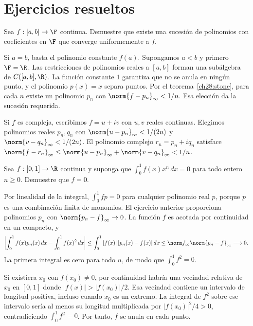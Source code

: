 \section{Ejercicios resueltos}
\begin{ejercicio}
Sea $f:[a,b]\to\F$ continua. Demuestre que existe una sucesión de polinomios con coeficientes en $\F$ que converge uniformemente a $f$.
\end{ejercicio}
\begin{solucion}
Si $a=b$, basta el polinomio constante $f(a)$. Supongamos $a<b$ y primero $\F=\R$. Las restricciones de polinomios reales a $[a,b]$ forman una subálgebra de $C([a,b],\R)$. La función constante $1$ garantiza que no se anula en ningún punto, y el polinomio $p(x)=x$ separa puntos. Por el teorema~\ref{ch28:stone}, para cada $n$ existe un polinomio $p_n$ con $\norm{f-p_n}_\infty<1/n$. Esa elección da la sucesión requerida.

Si $f$ es compleja, escribimos $f=u+iv$ con $u,v$ reales continuas. Elegimos polinomios reales $p_n,q_n$ con $\norm{u-p_n}_\infty<1/(2n)$ y $\norm{v-q_n}_\infty<1/(2n)$. El polinomio complejo $r_n=p_n+iq_n$ satisface
$\norm{f-r_n}_\infty\le\norm{u-p_n}_\infty+\norm{v-q_n}_\infty<1/n$.
\end{solucion}

\begin{ejercicio}
Sea $f:[0,1]\to\R$ continua y suponga que $\int_0^1 f(x)x^n\,dx=0$ para todo entero $n\ge0$. Demuestre que $f=0$.
\end{ejercicio}
\begin{solucion}
Por linealidad de la integral, $\int_0^1fp=0$ para cualquier polinomio real $p$, porque $p$ es una combinación finita de monomios. El ejercicio anterior proporciona polinomios $p_n$ con $\norm{p_n-f}_\infty\to0$. La función $f$ es acotada por continuidad en un compacto, y
\[
 \left|\int_0^1f(x)p_n(x)\,dx-\int_0^1f(x)^2\,dx\right|
 \le\int_0^1|f(x)|\,|p_n(x)-f(x)|\,dx
 \le\norm f_\infty\norm{p_n-f}_\infty\longrightarrow0.
\]
La primera integral es cero para todo $n$, de modo que $\int_0^1f^2=0$.

Si existiera $x_0$ con $f(x_0)\ne0$, por continuidad habría una vecindad relativa de $x_0$ en $[0,1]$ donde $|f(x)|>|f(x_0)|/2$. Esa vecindad contiene un intervalo de longitud positiva, incluso cuando $x_0$ es un extremo. La integral de $f^2$ sobre ese intervalo sería al menos su longitud multiplicada por $|f(x_0)|^2/4>0$, contradiciendo $\int_0^1f^2=0$. Por tanto, $f$ se anula en cada punto.
\end{solucion}

